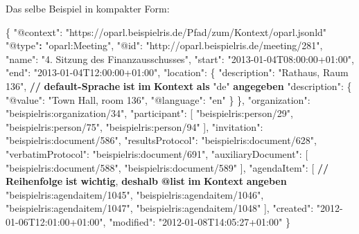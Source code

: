 \documentclass[,a4paper]{article}
\newenvironment{Shaded}{}{}
\newcommand{\DataTypeTok}[1]{\textcolor[rgb]{0.56,0.13,0.00}{{#1}}}
\newcommand{\StringTok}[1]{\textcolor[rgb]{0.25,0.44,0.63}{{#1}}}
\newcommand{\ErrorTok}[1]{\textcolor[rgb]{1.00,0.00,0.00}{\textbf{{#1}}}}
\newcommand{\NormalTok}[1]{{#1}}
\begin{document}
Das selbe Beispiel in kompakter Form:

\begin{Shaded}
\begin{Highlighting}[]
\NormalTok{\{}
    \DataTypeTok{"@context"}\NormalTok{: }\StringTok{"https://oparl.beispielris.de/Pfad/zum/Kontext/oparl.jsonld"}
    \StringTok{"@type"}\ErrorTok{:} \StringTok{"oparl:Meeting"}\NormalTok{,}
    \DataTypeTok{"@id"}\NormalTok{: }\StringTok{"http://oparl.beispielris.de/meeting/281"}\NormalTok{,}
    \DataTypeTok{"name"}\NormalTok{: }\StringTok{"4. Sitzung des Finanzausschusses"}\NormalTok{,}
    \DataTypeTok{"start"}\NormalTok{: }\StringTok{"2013-01-04T08:00:00+01:00"}\NormalTok{,}
    \DataTypeTok{"end"}\NormalTok{: }\StringTok{"2013-01-04T12:00:00+01:00"}\NormalTok{,}
    \DataTypeTok{"location"}\NormalTok{: \{}
        \DataTypeTok{"description"}\NormalTok{: }\StringTok{"Rathaus, Raum 136"}\NormalTok{, }\ErrorTok{//} \ErrorTok{default-Sprache} \ErrorTok{ist} \ErrorTok{im} \ErrorTok{Kontext} \ErrorTok{als} \DataTypeTok{"de"} \ErrorTok{angegeben}
        \DataTypeTok{"description"}\NormalTok{: \{}
            \DataTypeTok{"@value"}\NormalTok{: }\StringTok{"Town Hall, room 136"}\NormalTok{,}
            \DataTypeTok{"@language"}\NormalTok{: }\StringTok{"en"}
        \NormalTok{\}}
    \NormalTok{\},}
    \DataTypeTok{"organization"}\NormalTok{: }\StringTok{"beispielris:organization/34"}\NormalTok{,}
    \DataTypeTok{"participant"}\NormalTok{: [}
        \StringTok{"beispielris:person/29"}\NormalTok{,}
        \StringTok{"beispielris:person/75"}\NormalTok{,}
        \StringTok{"beispielris:person/94"}
    \NormalTok{],}
    \DataTypeTok{"invitation"}\NormalTok{: }\StringTok{"beispielris:document/586"}\NormalTok{,}
    \DataTypeTok{"resultsProtocol"}\NormalTok{: }\StringTok{"beispielris:document/628"}\NormalTok{,}
    \DataTypeTok{"verbatimProtocol"}\NormalTok{: }\StringTok{"beispielris:document/691"}\NormalTok{,}
    \DataTypeTok{"auxiliaryDocument"}\NormalTok{: [}
        \StringTok{"beispielris:document/588"}\NormalTok{,}
        \StringTok{"beispielris:document/589"}
    \NormalTok{],}
    \DataTypeTok{"agendaItem"}\NormalTok{: [}
    \ErrorTok{//} \ErrorTok{Reihenfolge} \ErrorTok{ist} \ErrorTok{wichtig}\NormalTok{, }\ErrorTok{deshalb} \ErrorTok{@list} \ErrorTok{im} \ErrorTok{Kontext} \ErrorTok{angeben}
        \StringTok{"beispielris:agendaitem/1045"}\NormalTok{,}
        \StringTok{"beispielris:agendaitem/1046"}\NormalTok{,}
        \StringTok{"beispielris:agendaitem/1047"}\NormalTok{,}
        \StringTok{"beispielris:agendaitem/1048"}
    \NormalTok{],}
    \DataTypeTok{"created"}\NormalTok{: }\StringTok{"2012-01-06T12:01:00+01:00"}\NormalTok{,}
    \DataTypeTok{"modified"}\NormalTok{: }\StringTok{"2012-01-08T14:05:27+01:00"}
\NormalTok{\}}
\end{Highlighting}
\end{Shaded}
\end{document}
